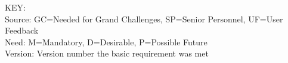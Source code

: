 \noindent
KEY:\\
Source: GC=Needed for Grand Challenges, SP=Senior Personnel, UF=User Feedback \\
Need: M=Mandatory, D=Desirable, P=Possible Future \\
Version: Version number the basic requirement was met 

